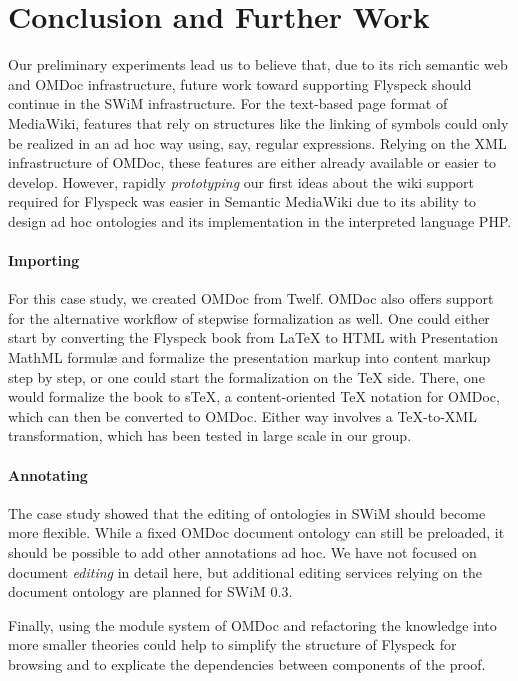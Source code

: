 
\section{Conclusion and Further Work}
\label{sec:conc}

Our preliminary experiments lead us to believe that, due to its rich
semantic web and OMDoc infrastructure, future work toward supporting
Flyspeck should continue in the SWiM infrastructure.  For the text-based
page format of MediaWiki, features that rely on structures like the
linking of symbols could only be realized in an ad hoc way
using, say, regular expressions.  Relying on the XML infrastructure of
OMDoc, these features are either already available or easier to develop.
However, rapidly \emph{prototyping} our first ideas about the wiki
support required for Flyspeck was easier in Semantic MediaWiki due to
its ability to design ad hoc ontologies and its implementation in the
interpreted language PHP.

\paragraph{Importing} For this case study, we created OMDoc from Twelf. OMDoc
also offers support for the alternative workflow of stepwise formalization as
well.  One could either start by converting the Flyspeck book from {\LaTeX} to
HTML with Presentation MathML formulæ and formalize the presentation markup into
content markup step by step, or one could start the formalization on the {\TeX}
side.  There, one would formalize the book to s\TeX{}, a content-oriented {\TeX}
notation for OMDoc, which can then be converted to OMDoc\cite{Kohlhase:albwo06}.
Either way involves a {\TeX}-to-XML transformation, which has been tested in
large scale in our group\cite{URL:arXMLiv}.

\paragraph{Annotating} The case study showed that the editing of ontologies in
SWiM should become more flexible.  While a fixed OMDoc document ontology can
still be preloaded, it should be possible to add other annotations ad hoc.  We
have not focused on document \emph{editing} in detail here, but additional
editing services relying on the document ontology are planned for SWiM
0.3\cite{swim-roadmap,Lange:SWiMSciColl07}.

Finally, using the module system of OMDoc and refactoring the knowledge into
more smaller theories could help to simplify the structure of Flyspeck for
browsing and to explicate the dependencies between components of the proof.

